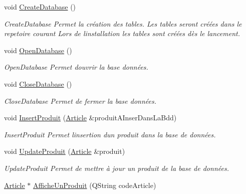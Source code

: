 \begin{DoxyCompactItemize}
void \mbox{\hyperlink{class_database_a832119560d0d28b759930f0e25b6d58c}{Create\+Database}} ()
\begin{DoxyCompactList}\small\item\em Create\+Database Permet la création des tables. Les tables seront créées dans le repetoire courant Lors de l\textquotesingle{}installation les tables sont créées dès le lancement. \end{DoxyCompactList}\item 
\mbox{\label{class_database_ab9dd492fa985aab34f9994a0c0eaf09e}} 
void \mbox{\hyperlink{class_database_ab9dd492fa985aab34f9994a0c0eaf09e}{Open\+Database}} ()
\begin{DoxyCompactList}\small\item\em Open\+Database Permet d\textquotesingle{}ouvrir la base données. \end{DoxyCompactList}\item 
\mbox{\label{class_database_ab5f6aae31ad0d80f5b0469237ba28421}} 
void \mbox{\hyperlink{class_database_ab5f6aae31ad0d80f5b0469237ba28421}{Close\+Database}} ()
\begin{DoxyCompactList}\small\item\em Close\+Database Permet de fermer la base données. \end{DoxyCompactList}\item 
void \mbox{\hyperlink{class_database_a876113e6495199697973a3820d72c744}{Insert\+Produit}} (\mbox{\hyperlink{class_article}{Article}} \&produit\+A\+Inser\+Dans\+La\+Bdd)
\begin{DoxyCompactList}\small\item\em Insert\+Produit Permet l\textquotesingle{}insertion d\textquotesingle{}un produit dans la base de données. \end{DoxyCompactList}\item 
void \mbox{\hyperlink{class_database_a145776bb933815c6b895d90ef8e0c64d}{Update\+Produit}} (\mbox{\hyperlink{class_article}{Article}} \&produit)
\begin{DoxyCompactList}\small\item\em Update\+Produit Permet de mettre à jour un produit de la base de données. \end{DoxyCompactList}\item 
\mbox{\hyperlink{class_article}{Article}} $\ast$ \mbox{\hyperlink{class_database_a925707cc35daef56c5d0009c352325fb}{Affiche\+Un\+Produit}} (Q\+String code\+Article)

\end{DoxyCompactItemize}
